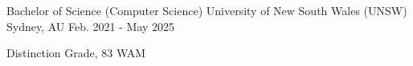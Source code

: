 

\begin{cventries}

  \cventry
    {Bachelor of Science (Computer Science)} %
    {University of New South Wales (UNSW)} %
    {Sydney, AU} %
    {Feb. 2021 - May 2025} %
    {
      \begin{cvitems}
        \item {Distinction Grade, 83 WAM}
      \end{cvitems}
    }

\end{cventries}
